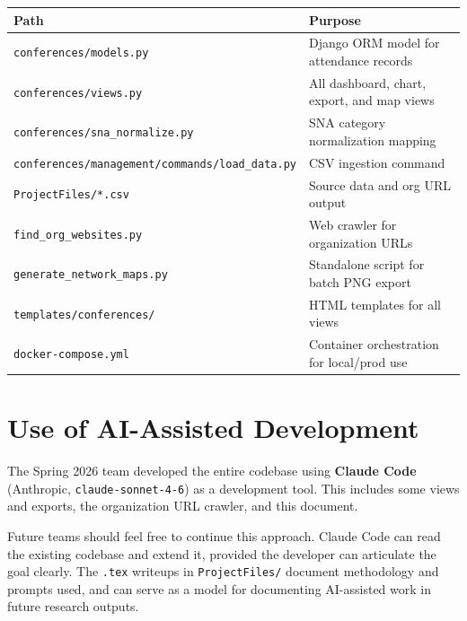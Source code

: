 \documentclass[12pt]{article}
\begin{document}
\begin{center}
\begin{tabular}{lp{8.5cm}}
\toprule
Path & Purpose \\
\midrule
\texttt{conferences/models.py} & Django ORM model for attendance records \\
\texttt{conferences/views.py} & All dashboard, chart, export, and map views \\
\texttt{conferences/sna\_normalize.py} & SNA category normalization mapping \\
\texttt{conferences/management/commands/load\_data.py} & CSV ingestion command \\
\texttt{ProjectFiles/*.csv} & Source data and org URL output \\
\texttt{find\_org\_websites.py} & Web crawler for organization URLs \\
\texttt{generate\_network\_maps.py} & Standalone script for batch PNG export \\
\texttt{templates/conferences/} & HTML templates for all views \\
\texttt{docker-compose.yml} & Container orchestration for local/prod use \\
\bottomrule
\end{tabular}
\end{center}

\section{Use of AI-Assisted Development}

The Spring 2026 team developed the entire codebase using
\textbf{Claude Code} (Anthropic, \texttt{claude-sonnet-4-6}) as a
development tool. This includes some views and exports, the organization
URL crawler, and this document.

Future teams should feel free to continue this approach. Claude Code can
read the existing codebase and extend it, provided the developer can articulate
the goal clearly. The \texttt{.tex} writeups in \texttt{ProjectFiles/}
document methodology and prompts used, and can serve as a model for
documenting AI-assisted work in future research outputs.
\end{document}
